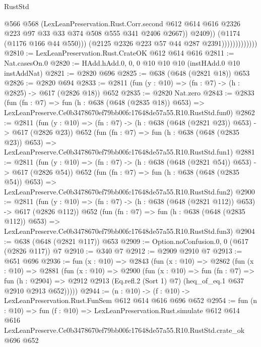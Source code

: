 \begin{lexlean}{RustStd}
\begin{coremodule}
                                    @566
                                    @568
                                    (LexLeanPreservation.Rust.Corr.second
                                      @612
                                      @614
                                      @616
                                      @2326
                                      @223
                                      @97
                                      @33
                                      @33
                                      @374
                                      @508
                                      @555
                                      @341
                                      @2406
                                      @2667))
                                  @2409))
                              (@1174 (@1176 @166 @44 @550)))
                            (@2125 @2326 @223 @57 @44 @287 @2391)))))))))))))
@2810 := LexLeanPreservation.Rust.CrateOK @612 @614 @616
@2811 := Nat.casesOn.{0}
@2820 := HAdd.hAdd.{0, 0, 0} @10 @10 @10 (instHAdd.{0} @10 instAddNat)
@2821 := @2820 @696
@2825 := @638 (@648 (@2821 @18)) @653
@2826 := @2820 @694
@2833 := @2811 (fun (y : @10) => (fn : @7) -> (h : @2825) -> @617 (@2826 @18)) @652
@2835 := @2820 Nat.zero
@2843 := @2833
    (fun (fn : @7) =>
    fun (h : @638 (@648 (@2835 @18)) @653) =>
    LexLeanPreserve.Ce0b3478670ef79bb00fc17648de57a55.R10.RustStd.fun0)
@2862 := @2811
    (fun (y : @10) => (fn : @7) -> (h : @638 (@648 (@2821 @23)) @653) -> @617 (@2826 @23))
    @652
    (fun (fn : @7) =>
    fun (h : @638 (@648 (@2835 @23)) @653) =>
    LexLeanPreserve.Ce0b3478670ef79bb00fc17648de57a55.R10.RustStd.fun1)
@2881 := @2811
    (fun (y : @10) => (fn : @7) -> (h : @638 (@648 (@2821 @54)) @653) -> @617 (@2826 @54))
    @652
    (fun (fn : @7) =>
    fun (h : @638 (@648 (@2835 @54)) @653) =>
    LexLeanPreserve.Ce0b3478670ef79bb00fc17648de57a55.R10.RustStd.fun2)
@2900 := @2811
    (fun (y : @10) => (fn : @7) -> (h : @638 (@648 (@2821 @112)) @653) -> @617 (@2826 @112))
    @652
    (fun (fn : @7) =>
    fun (h : @638 (@648 (@2835 @112)) @653) =>
    LexLeanPreserve.Ce0b3478670ef79bb00fc17648de57a55.R10.RustStd.fun3)
@2904 := @638 (@648 (@2821 @117)) @653
@2909 := Option.noConfusion.{0, 0} (@617 (@2826 @117)) @7
@2910 := @340 @7
@2912 := @2909 @2910 @7
@2913 := @651 @696
@2936 := fun (x : @10) =>
  @2843
    (fun (x : @10) =>
    @2862
      (fun (x : @10) =>
      @2881
        (fun (x : @10) =>
        @2900
          (fun (x : @10) =>
          fun (fn : @7) =>
          fun (h : @2904) =>
          @2912 @2913 (Eq.refl.{2} (Sort 1) @7) (heq_of_eq.{1} @637 @2910 @2913 @652)))))
@2944 := (n : @10) -> (f : @10) -> LexLeanPreservation.Rust.FunSem @612 @614 @616 @696 @652
@2954 := fun (n : @10) =>
  fun (f : @10) =>
  LexLeanPreservation.Rust.simulate
    @612
    @614
    @616
    LexLeanPreserve.Ce0b3478670ef79bb00fc17648de57a55.R10.RustStd.crate_ok
    @696
    @652
\end{coremodule}
\end{lexlean}
